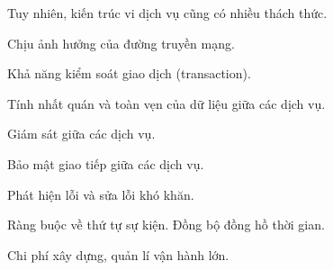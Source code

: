

Tuy nhiên, kiến trúc vi dịch vụ cũng có nhiều thách thức.

  Chịu ảnh hưởng của đường truyền mạng.  

  Khả năng kiểm soát giao dịch (transaction).  

  Tính nhất quán và toàn vẹn của dữ liệu giữa các dịch vụ.  

Giám sát giữa các dịch vụ.

Bảo mật giao tiếp giữa các dịch vụ.

  Phát hiện lỗi và sửa lỗi khó khăn.  

Ràng buộc về thứ tự sự kiện.
Đồng bộ đồng hồ thời gian.

  Chi phí xây dựng, quản lí vận hành lớn.  
